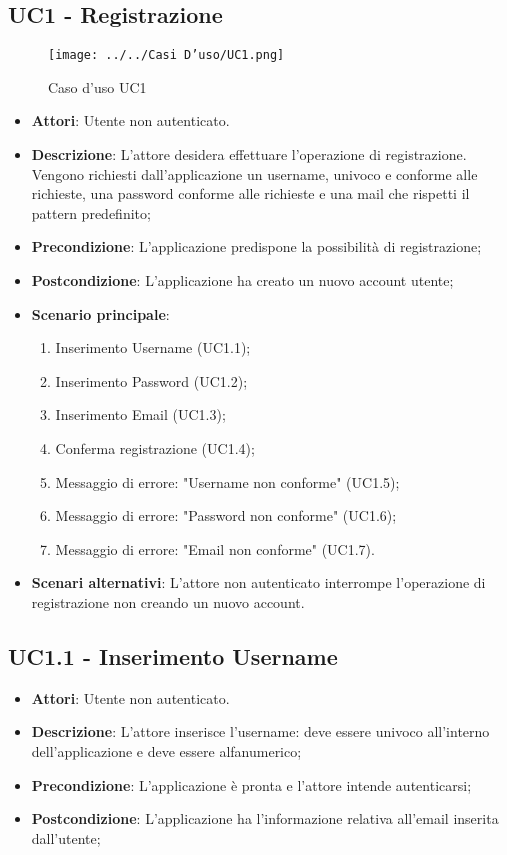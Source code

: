 \subsection{UC1 - Registrazione} 
\label{ssec:UC1} 
\begin{figure}[h!] 
\centering 
\texttt{[image: ../../Casi D'uso/UC1.png]} 
\caption{Caso d'uso UC1} 
 \end{figure} 
\begin{itemize} 
\item \textbf{Attori}: Utente non autenticato.
\item \textbf{Descrizione}: L'attore desidera effettuare l'operazione di registrazione. Vengono richiesti dall'applicazione un username, univoco e conforme alle richieste, una password conforme alle richieste e una mail che rispetti il pattern predefinito;
\item \textbf{Precondizione}: L'applicazione predispone la possibilità di registrazione;
\item \textbf{Postcondizione}: L'applicazione ha creato un nuovo account utente;
\item \textbf{Scenario principale}: \begin{enumerate}\item Inserimento Username (UC1.1);\item Inserimento Password (UC1.2);\item Inserimento Email (UC1.3);\item Conferma registrazione (UC1.4);\item Messaggio di errore: "Username non conforme" (UC1.5);\item Messaggio di errore: "Password non conforme" (UC1.6);\item Messaggio di errore: "Email non conforme" (UC1.7). 
 \end{enumerate}
\item \textbf{Scenari alternativi}: L’attore non autenticato interrompe l’operazione di registrazione non creando un nuovo account.
\end{itemize} 
\subsection{UC1.1 - Inserimento Username} 
\label{ssec:UC1.1} 
\begin{itemize} 
\item \textbf{Attori}: Utente non autenticato.
\item \textbf{Descrizione}: L’attore inserisce l'username: deve essere univoco all'interno dell'applicazione e deve essere alfanumerico;
\item \textbf{Precondizione}: L'applicazione è pronta e l'attore intende autenticarsi;
\item \textbf{Postcondizione}: L'applicazione ha l’informazione relativa all'email inserita dall’utente;
\end{itemize} 
